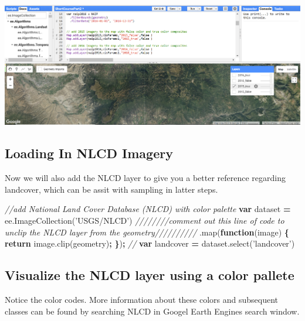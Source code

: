 \documentclass[]{article}
\newenvironment{Shaded}{\begin{snugshade}}{\end{snugshade}}
\newcommand{\KeywordTok}[1]{\textcolor[rgb]{0.13,0.29,0.53}{\textbf{#1}}}
\newcommand{\StringTok}[1]{\textcolor[rgb]{0.31,0.60,0.02}{#1}}
\newcommand{\CommentTok}[1]{\textcolor[rgb]{0.56,0.35,0.01}{\textit{#1}}}
\newcommand{\VariableTok}[1]{\textcolor[rgb]{0.00,0.00,0.00}{#1}}
\newcommand{\ControlFlowTok}[1]{\textcolor[rgb]{0.13,0.29,0.53}{\textbf{#1}}}
\newcommand{\OperatorTok}[1]{\textcolor[rgb]{0.81,0.36,0.00}{\textbf{#1}}}
\newcommand{\AttributeTok}[1]{\textcolor[rgb]{0.77,0.63,0.00}{#1}}
\newcommand{\NormalTok}[1]{#1}
\begin{document}
\includegraphics{True_Color_ScreenShot1.png}

\subsection{Loading In NLCD Imagery}\label{loading-in-nlcd-imagery}

Now we will also add the NLCD layer to give you a better reference
regarding landcover, which can be assit with sampling in latter steps.

\begin{Shaded}
\begin{Highlighting}[]

\CommentTok{//add National Land Cover Database (NLCD) with color palette}
\KeywordTok{var}\NormalTok{ dataset }\OperatorTok{=} \VariableTok{ee}\NormalTok{.}\AttributeTok{ImageCollection}\NormalTok{(}\StringTok{'USGS/NLCD'}\NormalTok{)}
\CommentTok{////////comment out this line of code to unclip the NLCD layer from the geometry//////////}
\NormalTok{  .}\AttributeTok{map}\NormalTok{(}\KeywordTok{function}\NormalTok{(image) }\OperatorTok{\{} \ControlFlowTok{return} \VariableTok{image}\NormalTok{.}\AttributeTok{clip}\NormalTok{(geometry)}\OperatorTok{;} \OperatorTok{\}}\NormalTok{)}\OperatorTok{;}
\CommentTok{//}
\KeywordTok{var}\NormalTok{ landcover }\OperatorTok{=} \VariableTok{dataset}\NormalTok{.}\AttributeTok{select}\NormalTok{(}\StringTok{'landcover'}\NormalTok{)}
\end{Highlighting}
\end{Shaded}

\subsection{Visualize the NLCD layer using a color
pallete}\label{visualize-the-nlcd-layer-using-a-color-pallete}

Notice the color codes. More information about these colors and
subsequent classes can be found by searching NLCD in Googel Earth
Engines search window.
\end{document}
